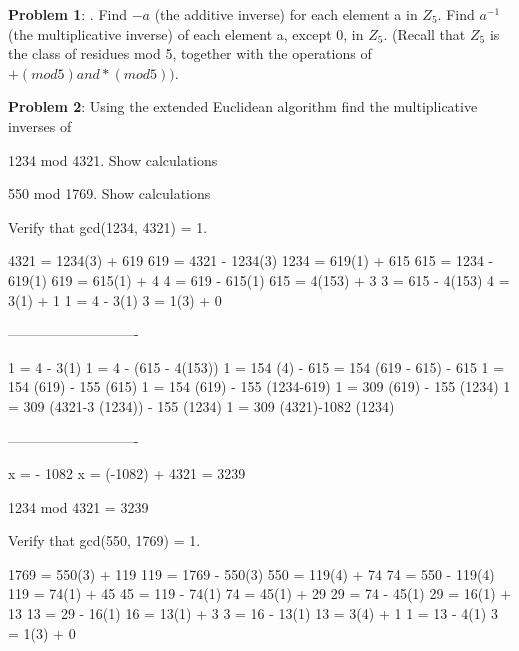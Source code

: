 \documentclass[12pt,letterpaper,final]{report}
\begin{document}

\vline


\noindent\textbf{Problem 1}: . Find $-a$ (the additive inverse) for each element a in $Z_{5}$.  Find $a^{-1}$   (the multiplicative inverse) of each element a, except 0, in $Z_{5}$. 
(Recall that $Z_{5}$   is the class of residues mod 5, together with the operations of $+ (mod 5) and * (mod 5))$.
 

\bigskip
\noindent\textbf{Problem 2}: Using the extended Euclidean algorithm find the multiplicative inverses of

\begin{alphalist}
	\item 1234 mod 4321. Show calculations
	\item 550 mod 1769. Show calculations
	
\end{alphalist}

\bigskip
Verify that gcd(1234, 4321) = 1.

4321 = 1234(3) + 619	619 = 4321 - 1234(3)	
1234 = 619(1) + 615	615 = 1234 - 619(1)	
619 = 615(1) + 4		4 = 619 - 615(1)	
615 = 4(153) + 3		3 = 615 - 4(153)	
4 = 3(1) + 1			1 = 4 - 3(1)
3 = 1(3) + 0  

----------------------------

1 = 4 - 3(1)
1 = 4 - (615 - 4(153)) 
1 =  154 (4) - 615
 = 154 (619 - 615) - 615
1 = 154 (619) - 155 (615)
1 = 154 (619) - 155 (1234-619)
1 = 309 (619) - 155 (1234)
1 = 309 (4321-3 (1234)) - 155 (1234)
1 = 309 (4321)-1082 (1234)

----------------------------

x = - 1082
x = (-1082) + 4321 = 3239

1234 mod 4321 = 3239

\bigskip

Verify that gcd(550, 1769) = 1.

1769 = 550(3) + 119	119 = 1769 - 550(3)
550 = 119(4) + 74		74 = 550 - 119(4)
119 = 74(1) + 45		45 = 119 - 74(1)
74 = 45(1) + 29		29 = 74 - 45(1)
29 = 16(1) + 13		13 = 29 - 16(1)
16 = 13(1) + 3		3 = 16 - 13(1)
13 = 3(4) + 1		1 = 13 - 4(1)
3 = 1(3) + 0
\end{document}
